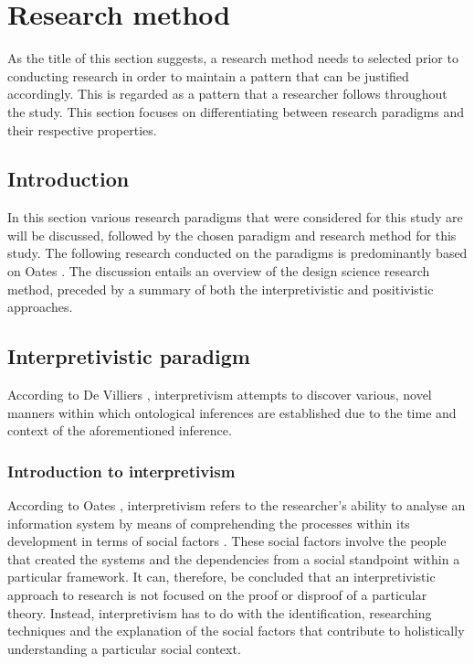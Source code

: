 \section{Research method}  %
As the title of this section suggests, a research method needs to selected prior to conducting research in order to maintain a pattern that can be justified accordingly. This is regarded as a pattern that a researcher follows throughout the study. This section focuses on differentiating between research paradigms and their respective properties.

\subsection{Introduction}
In this section various research paradigms that were considered for this study are will be discussed, followed by the chosen paradigm and research method for this study. The following research conducted on the paradigms is predominantly based on Oates \cite{OatesJ2006}. The discussion entails an overview of the design science research method, preceded by a summary of both the interpretivistic and positivistic approaches.

\subsection{Interpretivistic paradigm}
According to De Villiers \cite{DeVilliers2005}, interpretivism attempts to discover various, novel manners within which ontological inferences are established due to the time and context of the aforementioned inference.

\subsubsection{Introduction to interpretivism}
According to Oates \cite{OatesJ2006}, interpretivism refers to the researcher’s ability to analyse an information system by means of comprehending the processes within its development in terms of social factors \cite{OatesJ2006}. These social factors involve the people that created the systems and the dependencies from a social standpoint within a particular framework.
It can, therefore, be concluded that an interpretivistic approach to research is not focused on the proof or disproof of a particular theory. Instead, interpretivism has to do with the identification, researching techniques and the explanation of the social factors that contribute to holistically understanding a particular social context.

